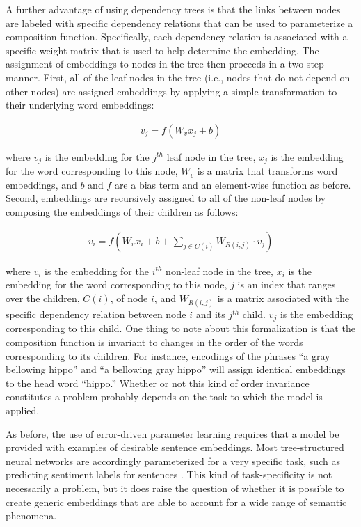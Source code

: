 A further advantage of using dependency trees is that the links between nodes are labeled with specific dependency relations that can be used to parameterize a composition function. Specifically, each dependency relation is associated with a specific weight matrix that is used to help determine the embedding. The assignment of embeddings to nodes in the tree then proceeds in a two-step manner. First, all of the leaf nodes in the tree (i.e., nodes that do not depend on other nodes) are assigned embeddings by applying a simple transformation to their underlying word embeddings:

\begin{align} 
\label{eqn:dt_rnn_leaf}
v_j = f (W_v x_j + b) 
\end{align}

\noindent
where $v_j$ is the embedding for the $j^{th}$ leaf node in the tree, $x_j$ is the embedding for the word corresponding to this node, $W_v$ is a matrix that transforms word embeddings, and $b$ and $f$ are a bias term and an element-wise function as before. Second, embeddings are recursively assigned to all of the non-leaf nodes by composing the embeddings of their children as follows:

\begin{align}
\label{eqn:dt_rnn_nonleaf}
v_i = f (W_v x_i + b + \sum_{j \in C(i)} W_{R(i,j)} \cdot v_j )
\end{align}

\noindent
where $v_i$ is the embedding for the $i^{th}$ non-leaf node in the tree, $x_i$ is the embedding for the word corresponding to this node, $j$ is an index that ranges over the children, $C(i)$, of node $i$, and $W_{R(i, j)}$ is a matrix associated with the specific dependency relation between node $i$ and its $j^{th}$ child. $v_j$ is the embedding corresponding to this child. One thing to note about this formalization is that the composition function is invariant to changes in the order of the words corresponding to its children. For instance, encodings of the phrases ``a gray bellowing hippo'' and ``a bellowing gray hippo'' will assign identical embeddings to the head word ``hippo.'' Whether or not this kind of order invariance constitutes a problem probably depends on the task to which the model is applied.

As before, the use of error-driven parameter learning requires that a model be provided with examples of desirable sentence embeddings. Most tree-structured neural networks are accordingly parameterized for a very specific task, such as predicting sentiment labels for sentences \citep{Socher:2011,Socher:2012}. This kind of task-specificity is not necessarily a problem, but it does raise the question of whether it is possible to create generic embeddings that are able to account for a wide range of semantic phenomena.

